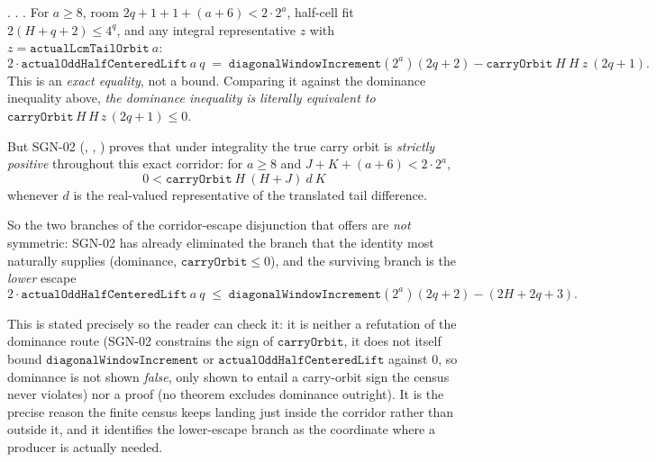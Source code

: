 \begin{obs}
\label{obs:staircase-tension}
.
. . For $a\ge 8$, room $2q{+}1{+}1{+}(a{+}6)<2\cdot2^a$, half-cell fit
$2(H{+}q{+}2)\le 4^q$, and any integral representative $z$ with $z = \mathtt{actualLcmTailOrbit}\ a$:
\[
  2\cdot \mathtt{actualOddHalfCenteredLift}\ a\ q
  \;=\; \mathtt{diagonalWindowIncrement}(2^a)(2q{+}2) - \mathtt{carryOrbit}\ H\ H\ z\ (2q{+}1) .
\]
This is an \emph{exact equality}, not a bound. Comparing it against the dominance inequality above,
\emph{the dominance inequality is literally equivalent to
$\mathtt{carryOrbit}\,H\,H\,z\,(2q{+}1)\le 0$}.

\par\medskip

But SGN-02
(, ,
) proves that under integrality the true carry orbit is \emph{strictly positive}
throughout this exact corridor: for $a\ge 8$ and $J{+}K{+}(a{+}6)<2\cdot 2^a$,
\[
  0 < \mathtt{carryOrbit}\ H\ (H{+}J)\ d\ K
\]
whenever $d$ is the real-valued representative of the translated tail difference.

\par\medskip

So the two branches of the corridor-escape disjunction that
offers are \emph{not} symmetric: SGN-02 has already eliminated the branch that the identity most
naturally supplies (dominance, $\mathtt{carryOrbit}\le 0$), and the surviving branch is the
\emph{lower} escape
\[
  2\cdot \mathtt{actualOddHalfCenteredLift}\ a\ q \;\le\;
  \mathtt{diagonalWindowIncrement}(2^a)(2q{+}2) - (2H{+}2q{+}3) .
\]

\par\medskip

This is stated precisely so the reader can check it: it is neither a refutation of the dominance
route (SGN-02 constrains the sign of $\mathtt{carryOrbit}$, it does not itself bound
$\mathtt{diagonalWindowIncrement}$ or $\mathtt{actualOddHalfCenteredLift}$ against $0$, so dominance
is not shown \emph{false}, only shown to entail a carry-orbit sign the census never violates) nor a
proof (no theorem excludes dominance outright). It is the precise reason the finite census keeps
landing just inside the corridor rather than outside it, and it identifies the lower-escape branch
as the coordinate where a producer is actually needed.
\end{obs}

